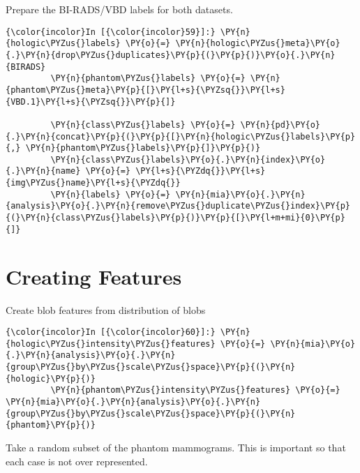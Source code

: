     Prepare the BI-RADS/VBD labels for both datasets.

    \begin{Verbatim}[commandchars=\\\{\}]
{\color{incolor}In [{\color{incolor}59}]:} \PY{n}{hologic\PYZus{}labels} \PY{o}{=} \PY{n}{hologic\PYZus{}meta}\PY{o}{.}\PY{n}{drop\PYZus{}duplicates}\PY{p}{(}\PY{p}{)}\PY{o}{.}\PY{n}{BIRADS}
         \PY{n}{phantom\PYZus{}labels} \PY{o}{=} \PY{n}{phantom\PYZus{}meta}\PY{p}{[}\PY{l+s}{\PYZsq{}}\PY{l+s}{VBD.1}\PY{l+s}{\PYZsq{}}\PY{p}{]}

         \PY{n}{class\PYZus{}labels} \PY{o}{=} \PY{n}{pd}\PY{o}{.}\PY{n}{concat}\PY{p}{(}\PY{p}{[}\PY{n}{hologic\PYZus{}labels}\PY{p}{,} \PY{n}{phantom\PYZus{}labels}\PY{p}{]}\PY{p}{)}
         \PY{n}{class\PYZus{}labels}\PY{o}{.}\PY{n}{index}\PY{o}{.}\PY{n}{name} \PY{o}{=} \PY{l+s}{\PYZdq{}}\PY{l+s}{img\PYZus{}name}\PY{l+s}{\PYZdq{}}
         \PY{n}{labels} \PY{o}{=} \PY{n}{mia}\PY{o}{.}\PY{n}{analysis}\PY{o}{.}\PY{n}{remove\PYZus{}duplicate\PYZus{}index}\PY{p}{(}\PY{n}{class\PYZus{}labels}\PY{p}{)}\PY{p}{[}\PY{l+m+mi}{0}\PY{p}{]}
\end{Verbatim}

    \section{Creating Features}\label{creating-features}

    Create blob features from distribution of blobs

    \begin{Verbatim}[commandchars=\\\{\}]
{\color{incolor}In [{\color{incolor}60}]:} \PY{n}{hologic\PYZus{}intensity\PYZus{}features} \PY{o}{=} \PY{n}{mia}\PY{o}{.}\PY{n}{analysis}\PY{o}{.}\PY{n}{group\PYZus{}by\PYZus{}scale\PYZus{}space}\PY{p}{(}\PY{n}{hologic}\PY{p}{)}
         \PY{n}{phantom\PYZus{}intensity\PYZus{}features} \PY{o}{=} \PY{n}{mia}\PY{o}{.}\PY{n}{analysis}\PY{o}{.}\PY{n}{group\PYZus{}by\PYZus{}scale\PYZus{}space}\PY{p}{(}\PY{n}{phantom}\PY{p}{)}
\end{Verbatim}

    Take a random subset of the phantom mammograms. This is important so
that each case is not over represented.

